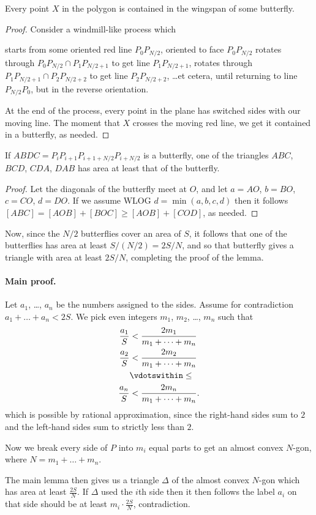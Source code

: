 \begin{claim*}
  Every point $X$ in the polygon is contained in the wingspan of some butterfly.
\end{claim*}
\begin{proof}
  Consider a windmill-like process which
  \begin{itemize}
    \ii starts from some oriented red line $P_0 P_{N/2}$, oriented to face $P_0 P_{N/2}$
    \ii rotates through $P_0 P_{N/2} \cap P_1 P_{N/2+1}$ to get line $P_1 P_{N/2+1}$,
    \ii rotates through $P_1 P_{N/2+1} \cap P_2 P_{N/2+2}$ to get line $P_2 P_{N/2+2}$,
    \ii \dots et cetera, until returning to line $P_{N/2} P_0$,
    but in the reverse orientation.
  \end{itemize}
  At the end of the process, every point in the plane has switched sides with our moving line.
  The moment that $X$ crosses the moving red line, we get it contained in a butterfly, as needed.
\end{proof}

\begin{claim*}
  If $ABDC = P_i P_{i+1} P_{i+1+N/2} P_{i+N/2}$ is a butterfly,
  one of the triangles $ABC$, $BCD$, $CDA$, $DAB$
  has area at least that of the butterfly.
\end{claim*}
\begin{proof}
  Let the diagonals of the butterfly meet at $O$,
  and let $a = AO$, $b = BO$, $c = CO$, $d = DO$.
  If we assume WLOG $d = \min(a,b,c,d)$
  then it follows $[ABC] = [AOB] + [BOC] \ge [AOB] + [COD]$, as needed.
\end{proof}

Now, since the $N/2$ butterflies cover an area of $S$,
it follows that one of the butterflies
has area at least $S / (N/2) = 2S/N$,
and so that butterfly gives a triangle with area at least $2S/N$,
completing the proof of the lemma.

\paragraph{Main proof.}
Let $a_1$, \dots, $a_n$ be the numbers assigned to the sides.
Assume for contradiction $a_1 + \dots + a_n < 2S$.
We pick even integers $m_1$, $m_2$, \dots, $m_n$ such that
\begin{align*}
  \frac{a_1}{S} &< \frac{2m_1}{m_1 + \dots + m_n} \\
  \frac{a_2}{S} &< \frac{2m_2}{m_1 + \dots + m_n} \\
  &\vdotswithin\le \\
  \frac{a_n}{S} &< \frac{2m_n}{m_1 + \dots + m_n}.
\end{align*}
which is possible by rational approximation,
since the right-hand sides sum to $2$ and the left-hand sides sum to strictly less than $2$.

Now we break every side of $P$ into $m_i$ equal parts
to get an almost convex $N$-gon, where $N = m_1 + \dots + m_n$.

The main lemma then gives us a triangle $\Delta$ of the almost convex $N$-gon
which has area at least $\frac{2S}{N}$.
If $\Delta$ used the $i$th side then it then follows the label $a_i$ on that side should be
at least $m_i \cdot \frac{2S}{N}$, contradiction.
\pagebreak




